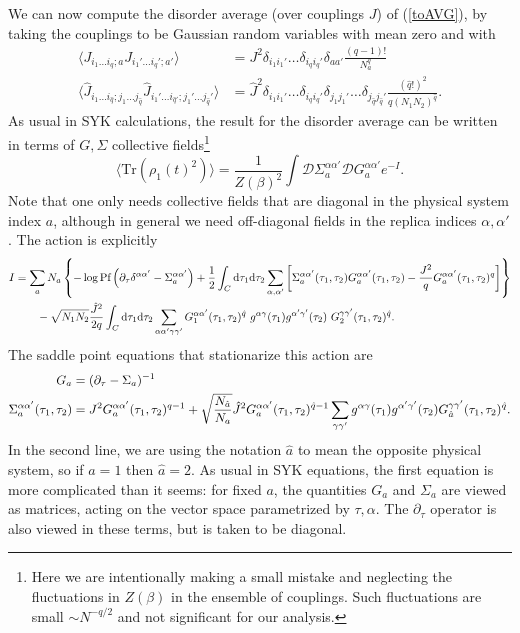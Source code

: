 \documentclass[11pt]{article}
\newcommand{\be}{\begin{equation}}
\newcommand{\ee}{\end{equation}}
\numberwithin{equation}{section}
\def\tr{\text{Tr}}
\begin{document}
We can now compute the disorder average (over couplings $J$) of (\ref{toAVG}), by taking the couplings to be Gaussian random variables with mean zero and with
\begin{align}
\langle J_{i_1\dots i_q;a} J_{i_1'\dots i_q';a'}\rangle &=J^2 \delta_{i_1 i_1'}\dots \delta_{i_q i_q'}\delta_{aa'} \frac{ (q-1)!}{N_a^q}\\
\langle \hat{J}_{i_1\dots i_{\hat{q}};j_1\dots j_{\hat{q}}} \hat{J}_{i_1'\dots i_{\hat{q}'};j_1'\dots j_{\hat{q}}'}\rangle &= \hat{J}^2\delta_{i_1 i_1'}\dots \delta_{i_q i_q'}\delta_{j_1j_1'}\dots \delta_{j_{\hat{q}}j_{\hat{q}}'}\frac{(\hat{q}!)^2}{q(N_1 N_2)^{\hat{q}}}.
\end{align}
As usual in SYK calculations, the result for the disorder average can be written in terms of $G,\Sigma$ collective fields\footnote{Here we are intentionally making a small mistake and neglecting the fluctuations in $Z(\beta)$ in the ensemble of couplings. Such fluctuations are small $\sim N^{-q/2}$ and not significant for our analysis.}
\be
\langle \tr\left(\rho_1(t)^2\right)\rangle = \frac{1}{Z(\beta)^2}\int\mathcal{D}\Sigma_{a}^{\alpha\alpha'}\mathcal{D}G_a^{\alpha\alpha'}e^{-I}.
\ee
Note that one only needs collective fields that are diagonal in the physical system index $a$, although in general we need off-diagonal fields in the replica indices $\alpha,\alpha'$. The action is explicitly
\begin{align}
I &= \sum_a N_a\left\{-\log\text{Pf}\left(\partial_\tau \delta^{\alpha\alpha'}-\Sigma_a^{\alpha\alpha'}\right) + \frac{1}{2}\int_C\mathrm{d}\tau_1\mathrm{d}\tau_2\sum_{\alpha,\alpha'}\left[\Sigma_a^{\alpha\alpha'}(\tau_1,\tau_2)G_a^{\alpha\alpha'}(\tau_1,\tau_2) - \frac{J^2}{q}G_{a}^{\alpha\alpha'}(\tau_1,\tau_2)^q\right]\right\}\notag\\&\hspace{20pt}- \sqrt{N_1N_2}\frac{\hat{J}^2}{2q}\int_C\mathrm{d}\tau_1\mathrm{d}\tau_2 \sum_{\alpha\alpha'\gamma\gamma'}G_1^{\alpha\alpha'}(\tau_1,\tau_2)^{\hat{q}} \ g^{\alpha\gamma}(\tau_1)g^{\alpha'\gamma'}(\tau_2) \ G_2^{\gamma\gamma'}(\tau_1,\tau_2)^{\hat{q}}.\label{SYKACTION}
\end{align}
The saddle point equations that stationarize this action are
\begin{align}
G_a &= (\partial_\tau - \Sigma_a)^{-1}\label{saddlePt}\\
\Sigma_a^{\alpha\alpha'}(\tau_1,\tau_2) &= J^2G_a^{\alpha\alpha'}(\tau_1,\tau_2)^{q-1} + \sqrt{\frac{N_{\hat{a}}}{N_a}}\hat{J}^2G_a^{\alpha\alpha'}(\tau_1,\tau_2)^{\hat{q}-1}\sum_{\gamma\gamma'}g^{\alpha\gamma}(\tau_1)g^{\alpha'\gamma'}(\tau_2)G_{\hat{a}}^{\gamma\gamma'}(\tau_1,\tau_2)^{\hat{q}}.\notag
\end{align}
In the second line, we are using the notation $\hat{a}$ to mean the opposite physical system, so if $a =1$ then $\hat{a} = 2$. As usual in SYK equations, the first equation is more complicated than it seems: for fixed $a$, the quantities $G_a$ and $\Sigma_a$ are viewed as matrices, acting on the vector space parametrized by $\tau,\alpha$. The $\partial_\tau$ operator is also viewed in these terms, but is taken to be diagonal.
\end{document}
